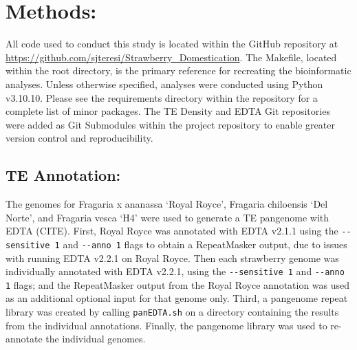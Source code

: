 \documentclass[fleqn,10pt]{olplainarticle}
\begin{document}
\section{Methods:} \label{sec:methods}
All code used to conduct this study is located within the GitHub repository at \url{https://github.com/sjteresi/Strawberry_Domestication}.
The Makefile, located within the root directory, is the primary reference for recreating the bioinformatic analyses.
Unless otherwise specified, analyses were conducted using Python v3.10.10.
Please see the requirements directory within the repository for a complete list of minor packages.
The TE Density and EDTA Git repositories were added as Git Submodules within the project repository to enable greater version control and reproducibility.


% 

\subsection{TE Annotation:} \label{sec:EDTA_methods}
The genomes for Fragaria x ananassa `Royal Royce', Fragaria chiloensis `Del Norte', and Fragaria vesca `H4' were used to generate a TE pangenome with EDTA (CITE).
First, Royal Royce was annotated with EDTA v2.1.1 using the \verb|--sensitive 1| and \verb|--anno 1| flags to obtain a RepeatMasker output, due to issues with running EDTA v2.2.1 on Royal Royce.
Then each strawberry genome was individually annotated with EDTA v2.2.1, using the \verb|--sensitive 1| and \verb|--anno 1| flags; and the RepeatMasker output from the Royal Royce annotation was used as an additional optional input for that genome only.
Third, a pangenome repeat library was created by calling \verb|panEDTA.sh| on a directory containing the results from the individual annotations.
Finally, the pangenome library was used to re-annotate the individual genomes.
\end{document}
